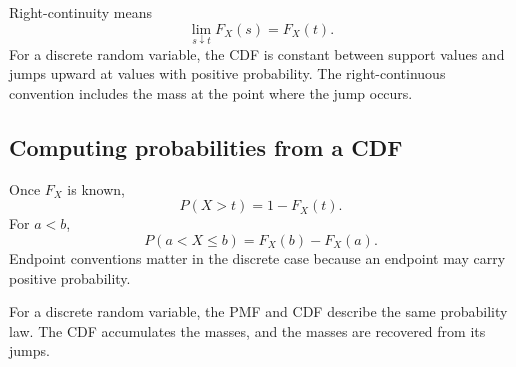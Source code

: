 Right-continuity means
\[
\lim_{s\downarrow t}F_X(s)=F_X(t).
\]
For a discrete random variable, the CDF is constant between support values and
jumps upward at values with positive probability. The right-continuous convention
includes the mass at the point where the jump occurs.

\subsection*{Computing probabilities from a CDF}

Once \(F_X\) is known,
\[
P(X>t)=1-F_X(t).
\]
For \(a<b\),
\[
P(a<X\leq b)=F_X(b)-F_X(a).
\]
Endpoint conventions matter in the discrete case because an endpoint may carry
positive probability.

\begin{theorembox}
For a discrete random variable, the PMF and CDF describe the same probability
law. The CDF accumulates the masses, and the masses are recovered from its jumps.
\end{theorembox}
